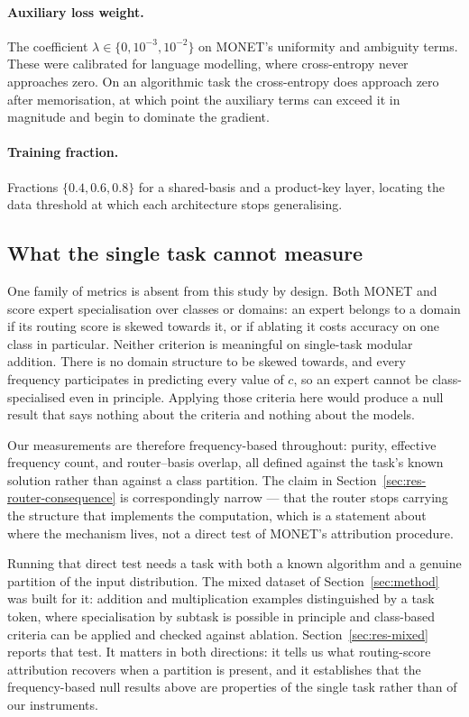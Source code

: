 \paragraph{Auxiliary loss weight.} The coefficient $\lambda \in \{0, 10^{-3},
10^{-2}\}$ on MONET's uniformity and ambiguity terms. These were calibrated
for language modelling, where cross-entropy never approaches zero. On an
algorithmic task the cross-entropy does approach zero after memorisation, at
which point the auxiliary terms can exceed it in magnitude and begin to
dominate the gradient.

\paragraph{Training fraction.} Fractions $\{0.4, 0.6, 0.8\}$ for a
shared-basis and a product-key layer, locating the data threshold at which
each architecture stops generalising.

\subsection{What the single task cannot measure}

One family of metrics is absent from this study by design. Both MONET and
\citet{oldfield2024mumoe} score expert specialisation over classes or domains:
an expert belongs to a domain if its routing score is skewed towards it, or if
ablating it costs accuracy on one class in particular. Neither criterion is
meaningful on single-task modular addition. There is no domain structure to be
skewed towards, and every frequency participates in predicting every value of
$c$, so an expert cannot be class-specialised even in principle. Applying
those criteria here would produce a null result that says nothing about the
criteria and nothing about the models.

Our measurements are therefore frequency-based throughout: purity, effective
frequency count, and router--basis overlap, all defined against the task's
known solution rather than against a class partition. The claim in
Section~\ref{sec:res-router-consequence} is correspondingly narrow --- that
the router stops carrying the structure that implements the computation, which
is a statement about where the mechanism lives, not a direct test of MONET's
attribution procedure.

Running that direct test needs a task with both a known algorithm and a genuine
partition of the input distribution. The mixed dataset of
Section~\ref{sec:method} was built for it: addition and multiplication examples
distinguished by a task token, where specialisation by subtask is possible in
principle and class-based criteria can be applied and checked against ablation.
Section~\ref{sec:res-mixed} reports that test. It matters in both directions:
it tells us what routing-score attribution recovers when a partition is
present, and it establishes that the frequency-based null results above are
properties of the single task rather than of our instruments.